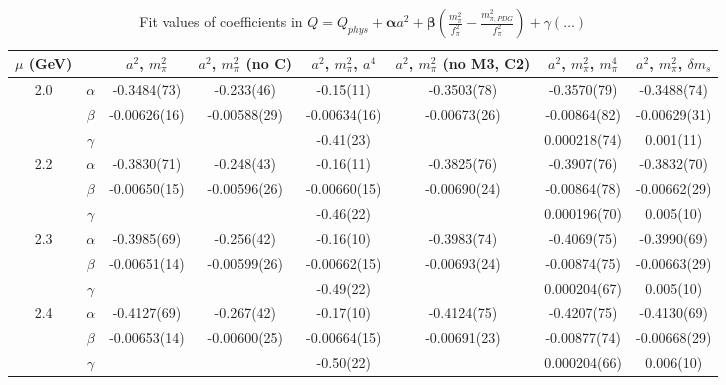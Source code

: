 \documentclass[12pt]{extarticle}
\begin{document}
\begin{table}[h!]
\begin{center}
\begin{tabular}{|c c|c|c|c|c|c|c|}
\hline
$\mu$ (GeV) &  & $a^2$, $m_\pi^2$& $a^2$, $m_\pi^2$ (no C)& $a^2$, $m_\pi^2$, $a^4$& $a^2$, $m_\pi^2$ (no M3, C2)& $a^2$, $m_\pi^2$, $m_\pi^4$& $a^2$, $m_\pi^2$, $\delta m_s$\\
\hline
\multirow{3}{0.5in}{2.0} & $\alpha$ & -0.3484(73)& -0.233(46)& -0.15(11)& -0.3503(78)& -0.3570(79)& -0.3488(74)\\
 & $\beta$ & -0.00626(16)& -0.00588(29)& -0.00634(16)& -0.00673(26)& -0.00864(82)& -0.00629(31)\\
 & $\gamma$ &  &  & -0.41(23)&  & 0.000218(74)& 0.001(11)\\
\hline
\multirow{3}{0.5in}{2.2} & $\alpha$ & -0.3830(71)& -0.248(43)& -0.16(11)& -0.3825(76)& -0.3907(76)& -0.3832(70)\\
 & $\beta$ & -0.00650(15)& -0.00596(26)& -0.00660(15)& -0.00690(24)& -0.00864(78)& -0.00662(29)\\
 & $\gamma$ &  &  & -0.46(22)&  & 0.000196(70)& 0.005(10)\\
\hline
\multirow{3}{0.5in}{2.3} & $\alpha$ & -0.3985(69)& -0.256(42)& -0.16(10)& -0.3983(74)& -0.4069(75)& -0.3990(69)\\
 & $\beta$ & -0.00651(14)& -0.00599(26)& -0.00662(15)& -0.00693(24)& -0.00874(75)& -0.00663(29)\\
 & $\gamma$ &  &  & -0.49(22)&  & 0.000204(67)& 0.005(10)\\
\hline
\multirow{3}{0.5in}{2.4} & $\alpha$ & -0.4127(69)& -0.267(42)& -0.17(10)& -0.4124(75)& -0.4207(75)& -0.4130(69)\\
 & $\beta$ & -0.00653(14)& -0.00600(25)& -0.00664(15)& -0.00691(23)& -0.00877(74)& -0.00668(29)\\
 & $\gamma$ &  &  & -0.50(22)&  & 0.000204(66)& 0.006(10)\\
\hline
\end{tabular}
\caption{Fit values of coefficients in $Q = Q_{phys} + \mathbf{\alpha} a^2 + \mathbf{\beta}\left(\frac{m_\pi^2}{f_\pi^2}-\frac{m_{\pi,PDG}^2}{f_\pi^2}\right) + \gamma(\ldots)$}
\end{center}
\end{table}





\end{document}
